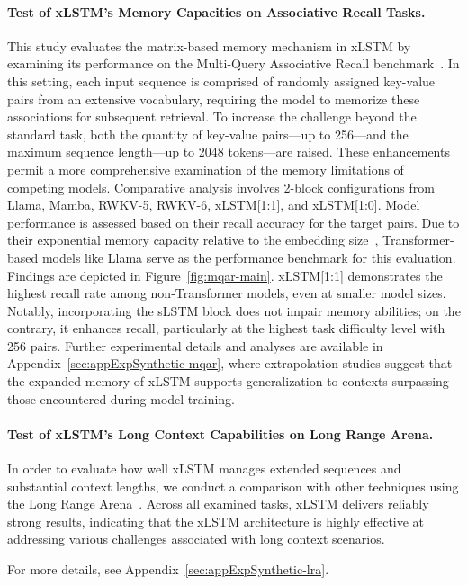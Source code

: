 \paragraph{Test of xLSTM's Memory Capacities on Associative Recall Tasks.} This study evaluates the matrix-based memory mechanism in xLSTM by examining its performance on the Multi-Query Associative Recall benchmark~\citep{Arora:23arxiv}. In this setting, each input sequence is comprised of randomly assigned key-value pairs from an extensive vocabulary, requiring the model to memorize these associations for subsequent retrieval. To increase the challenge beyond the standard task, both the quantity of key-value pairs—up to 256—and the maximum sequence length—up to 2048 tokens—are raised. These enhancements permit a more comprehensive examination of the memory limitations of competing models. Comparative analysis involves 2-block configurations from Llama, Mamba, RWKV-5, RWKV-6, xLSTM[1:1], and xLSTM[1:0]. Model performance is assessed based on their recall accuracy for the target pairs. Due to their exponential memory capacity relative to the embedding size~\citep{Ramsauer:21}, Transformer-based models like Llama serve as the performance benchmark for this evaluation. Findings are depicted in Figure~\ref{fig:mqar-main}. xLSTM[1:1] demonstrates the highest recall rate among non-Transformer models, even at smaller model sizes. Notably, incorporating the sLSTM block does not impair memory abilities; on the contrary, it enhances recall, particularly at the highest task difficulty level with 256 pairs. Further experimental details and analyses are available in Appendix~\ref{sec:appExpSynthetic-mqar}, where extrapolation studies suggest that the expanded memory of xLSTM supports generalization to contexts surpassing those encountered during model training.

\paragraph{Test of xLSTM's Long Context Capabilities on Long Range Arena.} In order to evaluate how well xLSTM manages extended sequences and substantial context lengths, we conduct a comparison with other techniques using the Long Range Arena~\citep{Tay:21}. Across all examined tasks, xLSTM delivers reliably strong results, indicating that the xLSTM architecture is highly effective at addressing various challenges associated with long context scenarios.

For more details, see Appendix~\ref{sec:appExpSynthetic-lra}.

